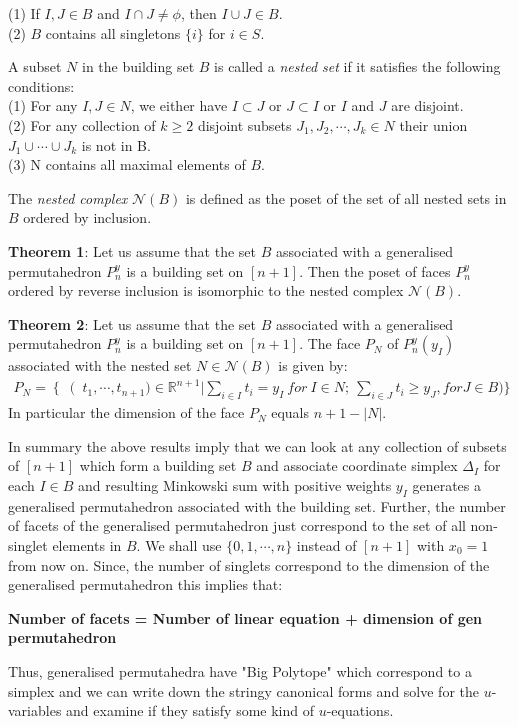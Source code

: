 \documentclass[hidelinks,12pt]{article}
\newcommand{\bea}[1]{\begin{eqnarray}\label{#1} }
\newcommand{\eea}{\end{eqnarray}}
\def\bea{\begin{eqnarray}}
\def\eea{\end{eqnarray}}
\begin{document}
\noindent(1) If $I,J \in B$ and $I \cap J \neq \phi $, then $I \cup J \in B$. \\
(2) $B$ contains all singletons $\{ i\}$ for $i \in S$.

A subset $N$ in the building set $B$ is called a {\it nested set} if it satisfies the following conditions:\\
\noindent
(1) For any $I,J \in N$, we either have $I \subset J$ or $J\subset I$ or $I$ and $J$ are disjoint.\\
(2) For any collection of $k \geq 2$ disjoint subsets $J_1,J_2,\cdots, J_k \in N$ their union $J_1 \cup \cdots \cup J_k$ is not in B. \\
(3) N contains all maximal elements of $B$.

The {\it nested complex} $\mathcal{N}(B)$ is defined as the poset of the set of all nested sets in $B$ ordered by inclusion.

{\bf Theorem 1}: Let us assume that the set $B$ associated with a generalised permutahedron $P_n^{y}$ is a building set on $[n+1]$. Then the poset of faces $P_n^{y}$ ordered by reverse inclusion is isomorphic to the nested complex $\mathcal{N}(B)$. 

{\bf Theorem 2}: Let us assume that the set $B$ associated with a generalised permutahedron $P_n^{y}$ is a building set on $[n+1]$. The face $P_N$ of $P_n^{y}(y_I)$ associated with the nested set $N \in \mathcal{N}(B)$ is given by:
\bea
P_N = \left \{ \right (t_1,\cdots,t_{n+1}) \in \mathbb{R}^{n+1} | \sum_{i \in I} t_i =y_{I}~for~I \in N; ~ \sum_{i \in J}t_i \geq y_J, for J \in B  )\}
\eea
In particular the dimension of the face $P_N$ equals $n+1-|N|$. 

In summary the above results imply that we can look at any collection of subsets of $[n+1]$ which form a building set $B$ and associate  coordinate simplex $\Delta_I$ for each $I \in B$ and resulting Minkowski sum with positive weights $y_I$ generates a generalised permutahedron associated with the building set. Further, the number of facets of the generalised permutahedron just correspond to the set of all non-singlet elements in $B$.  
We shall use $ \{0,1,\cdots,n \}$ instead of $[n+1]$ with $x_0 =1$ from now on. Since, the number of singlets correspond to the dimension of the generalised permutahedron this implies that:

{\bf Number of facets = Number of linear equation + dimension of  gen permutahedron}
 
Thus, generalised permutahedra have "Big Polytope" which correspond to a simplex and we can write down the stringy canonical forms and solve for the $u$-variables and examine if they satisfy some kind of $u$-equations.
\end{document}
